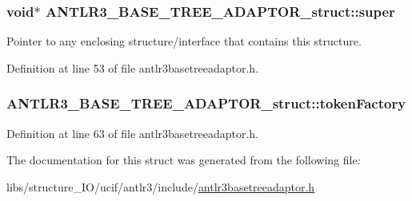 \hypertarget{struct_a_n_t_l_r3___b_a_s_e___t_r_e_e___a_d_a_p_t_o_r__struct_a092b489ee69367239890aa924adf649b}{
\subsubsection[{super}]{\setlength{\rightskip}{0pt plus 5cm}void$\ast$ A\-N\-T\-L\-R3\-\_\-\-B\-A\-S\-E\-\_\-\-T\-R\-E\-E\-\_\-\-A\-D\-A\-P\-T\-O\-R\-\_\-struct\-::super}}\label{struct_a_n_t_l_r3___b_a_s_e___t_r_e_e___a_d_a_p_t_o_r__struct_a092b489ee69367239890aa924adf649b}
Pointer to any enclosing structure/interface that contains this structure. 

Definition at line 53 of file antlr3basetreeadaptor.\-h.

\hypertarget{struct_a_n_t_l_r3___b_a_s_e___t_r_e_e___a_d_a_p_t_o_r__struct_add2f3c0291fa5a108a963408b8db39a6}{
\subsubsection[{token\-Factory}]{ A\-N\-T\-L\-R3\-\_\-\-B\-A\-S\-E\-\_\-\-T\-R\-E\-E\-\_\-\-A\-D\-A\-P\-T\-O\-R\-\_\-struct\-::token\-Factory}}\label{struct_a_n_t_l_r3___b_a_s_e___t_r_e_e___a_d_a_p_t_o_r__struct_add2f3c0291fa5a108a963408b8db39a6}


Definition at line 63 of file antlr3basetreeadaptor.\-h.



The documentation for this struct was generated from the following file\-:\begin{DoxyCompactItemize}
\item 
libs/structure\-\_\-\-I\-O/ucif/antlr3/include/\hyperlink{antlr3basetreeadaptor_8h}{antlr3basetreeadaptor.\-h}\end{DoxyCompactItemize}
